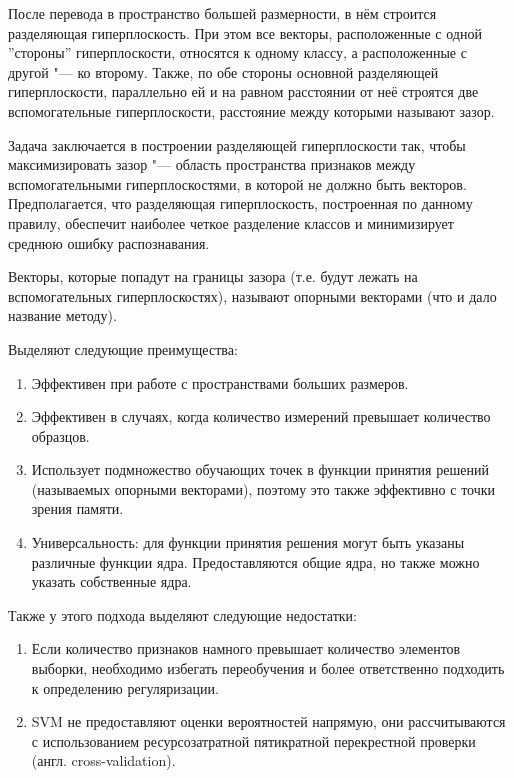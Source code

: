 \documentclass[bachelor, och, coursework]{SCWorks}
\begin{document}
            После перевода в пространство большей размерности, в нём строится
            разделяющая гиперплоскость. При этом все векторы, расположенные с
            одной ''стороны'' гиперплоскости, относятся к одному классу, а
            расположенные с другой "--- ко второму. Также, по обе стороны
            основной разделяющей гиперплоскости, параллельно ей и на равном
            расстоянии от неё строятся две вспомогательные гиперплоскости,
            расстояние между которыми называют зазор.

            Задача заключается в построении разделяющей гиперплоскости так,
            чтобы максимизировать зазор "--- область пространства признаков
            между вспомогательными гиперплоскостями, в которой не должно быть
            векторов. Предполагается, что разделяющая гиперплоскость,
            построенная по данному правилу, обеспечит наиболее четкое разделение
            классов и минимизирует среднюю ошибку распознавания.

            Векторы, которые попадут на границы зазора (т.е. будут лежать на
            вспомогательных гиперплоскостях), называют опорными векторами (что и
            дало название методу).

            Выделяют следующие преимущества:

            \begin{enumerate}
                \item Эффективен при работе с пространствами больших размеров.
                \item Эффективен в случаях, когда количество измерений превышает
                количество образцов.
                \item Использует подмножество обучающих точек в функции принятия
                решений (называемых опорными векторами), поэтому это также
                эффективно с точки зрения памяти.
                \item Универсальность: для функции принятия решения могут быть
                указаны различные функции ядра. Предоставляются общие ядра, но
                также можно указать собственные ядра.
            \end{enumerate}
            
            Также у этого подхода выделяют следующие недостатки:

            \begin{enumerate}
                \item Если количество признаков намного превышает количество
                элементов выборки, необходимо избегать переобучения и более
                ответственно подходить к определению регуляризации.
                \item SVM не предоставляют оценки вероятностей напрямую, они
                рассчитываются с использованием ресурсозатратной пятикратной
                перекрестной проверки (англ. cross-validation).
            \end{enumerate}
\end{document}
